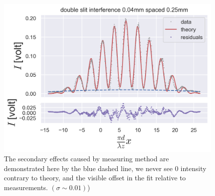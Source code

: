 \begin{figure}[H]
    \includegraphics[width=0.9\columnwidth]{figures/0.04w0.25s memory.png}
    \caption{The secondary effects caused by measuring method are demonstrated here by the blue dashed line, we never see 0 intensity contrary to theory, and the visible offset in the fit relative to measurements. $(\sigma\sim0.01)$)}
    \label{fig:0.04w0.25s memory}
\end{figure}